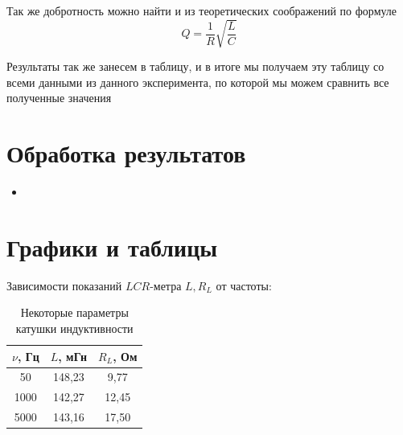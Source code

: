 \documentclass[a4paper, 12pt]{article}%
\begin{document}
Так же добротность можно найти и из теоретических соображений по формуле
\[Q = \dfrac{1}{R}\sqrt{\dfrac{L}{C}}\]

Результаты так же занесем в таблицу, и в итоге мы получаем эту таблицу со всеми данными из данного эксперимента, по которой мы можем сравнить все полученные значения

\section{Обработка результатов}

\begin{itemize}

\item 

\end{itemize}

\section{Графики и таблицы}

Зависимости показаний $LCR$-метра $L, R_L$ от частоты:   

\begin{table}[h!]
\begin{center}
\begin{tabular}{|c|c|c|}
\hline
$\nu$, Гц & $L$, мГн & $R_L$, Ом \\ \hline
50        & 148,23    & 9,77      \\ \hline
1000      & 142,27    & 12,45      \\ \hline
5000      & 143,16    & 17,50      \\ \hline
\end{tabular}
\caption{Некоторые параметры катушки индуктивности}
\end{center}
\end{table}
\end{document}

